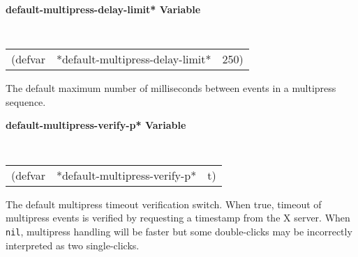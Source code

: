 \documentclass[twoside]{book}
\begin{document}
\begin{sloppy}
{\samepage
{\large {\bf *default-multipress-delay-limit* \hfill Variable}} 
\begin{flushright} \parbox[t]{6.125in}{
\tt
\begin{tabular}{lll}
\raggedright
(defvar & *default-multipress-delay-limit* & 250)
\end{tabular}
\rm

}\end{flushright}

\begin{flushright} \parbox[t]{6.125in}{
The default maximum number of milliseconds between events in a
multipress sequence.

}\end{flushright}}


{\samepage
{\large {\bf *default-multipress-verify-p* \hfill Variable}} 
\begin{flushright} \parbox[t]{6.125in}{
\tt
\begin{tabular}{lll}
\raggedright
(defvar & *default-multipress-verify-p* & t)
\end{tabular}
\rm

}\end{flushright}}

\begin{flushright} \parbox[t]{6.125in}{
The default multipress timeout verification switch. When true, timeout
of multipress events is verified by requesting a
timestamp from the X server. When {\tt nil}, multipress handling will
be faster but some double-clicks may be incorrectly interpreted as two
single-clicks.

}\end{flushright}


\end{sloppy}
\end{document}
